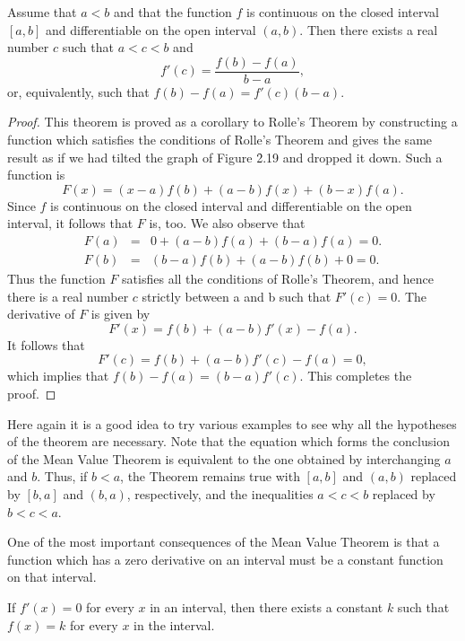 \begin{thm} 
\label{thm 2.5.2}
Assume that $a < b$ and that the function $f$ is continuous on the
closed interval $[a, b]$ and differentiable on the open interval $(a, b)$. Then there exists a real number $c$ such that $a < c < b$ and
$$
f'(c)= \frac{f(b) - f(a)}{b - a},
$$
\noindent or, equivalently, such that $f(b) - f(a) = f' (c)(b - a)$.
\end{thm}

\begin{proof}
This theorem is proved as a corollary to Rolle's Theorem by constructing a function which satisfies the conditions of Rolle's Theorem and gives the same result as if we had tilted the graph of Figure \f{2.19} and dropped it down. Such a function is
$$
F(x) = (x - a)f(b) + (a - b)f(x) + (b - x)f(a).
$$
Since $f$ is continuous on the closed interval and differentiable on the open interval, it follows that $F$ is, too. We also observe that
\begin{eqnarray*}
F(a) &=& 0 + (a - b)f(a) + (b - a)f(a) = 0.\\
F(b) &=& (b - a)f(b) + (a - b)f(b) + 0 = 0.
\end{eqnarray*}
Thus the function $F$ satisfies all the conditions of Rolle's Theorem, and hence there is a real number $c$ strictly between a and b such that $F'(c) = 0$. The derivative of $F$ is given by
$$
F'(x) = f(b) + (a - b) f'(x) - f(a).
$$
It follows that
$$
F'(c) = f(b) + (a - b)f'(c) - f(a) = 0,
$$
which implies that $f(b) - f(a) = (b - a) f'(c)$. This completes the proof.
\end{proof}

Here again it is a good idea to try various examples to see why all the hypotheses of the theorem are necessary. Note that the equation which forms the conclusion of the Mean Value Theorem is equivalent to the one obtained by interchanging $a$ and $b$. Thus, if $b < a$, the Theorem remains true with $[a, b]$ and $(a, b)$ replaced by $[b, a]$ and $(b, a)$, respectively, and the inequalities $a < c < b$ replaced by $b < c < a$.

One of the most important consequences of the Mean Value Theorem is that a function which has a zero derivative on an interval must be a constant function on that interval.
\begin{prop}
\label{thm 2.5.3}
If $f'(x) = 0$ for every  $x$ in an interval, then there exists a constant $k$ such that $f(x) = k$ for every $x$ in the interval.
\end{prop}

